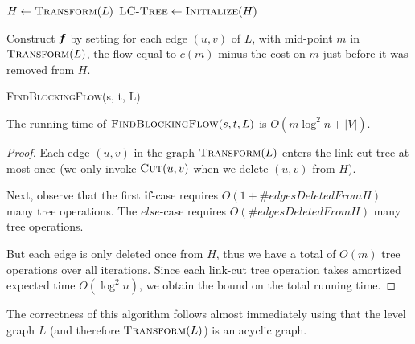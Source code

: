 \begin{algorithm}[H]
  \SetAlgoLined
  $H \leftarrow \textsc{Transform}(L)$\;
  $\textsc{LC-Tree} \gets \textsc{Initialize}(H)$\;
  
  Construct $\boldsymbol{\mathit{f}}$ by setting for each edge $(u,v)$ of $L$, with mid-point $m$ in $\textsc{Transform}(L)$, the flow equal to $c(m)$ minus the cost on $m$ just before it was removed from $H$.
  \caption{\textsc{FindBlockingFlow}(s, t, L)}
\end{algorithm}

\begin{claim}
The running time of $\textsc{FindBlockingFlow}(s, t, L)$ is $O(m \log^2 n + |V|)$.
\end{claim}
\begin{proof}
Each edge $(u,v)$ in the graph $\textsc{Transform}(L)$ enters the link-cut tree at most once (we only invoke $\textsc{Cut}(u,v)$ when we delete $(u,v)$ from $H$). 

Next, observe that the first $\mathbf{if}$-case requires $O(1 + \#edgesDeletedFromH)$ many tree operations. The $else$-case requires $O(\#edgesDeletedFromH)$ many tree operations. 

But each edge is only deleted once from $H$, thus we have a total of $O(m)$ tree operations over all iterations. Since each link-cut tree operation takes amortized expected time $O(\log^2 n)$, we obtain the bound on the total running time. 
\end{proof}

The correctness of this algorithm follows almost immediately using that the level graph $L$ (and therefore $\textsc{Transform}(L)$) is an acyclic graph.

